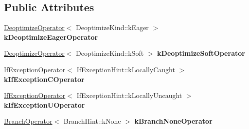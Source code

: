 \subsection*{Public Attributes}
\begin{DoxyCompactItemize}
\item 
\hyperlink{structv8_1_1internal_1_1compiler_1_1_common_operator_global_cache_1_1_deoptimize_operator}{Deoptimize\+Operator}$<$ Deoptimize\+Kind\+::k\+Eager $>$ {\bfseries k\+Deoptimize\+Eager\+Operator}\hypertarget{structv8_1_1internal_1_1compiler_1_1_common_operator_global_cache_ae3692729b84e54227b2440466cd98fbb}{}\label{structv8_1_1internal_1_1compiler_1_1_common_operator_global_cache_ae3692729b84e54227b2440466cd98fbb}

\item 
\hyperlink{structv8_1_1internal_1_1compiler_1_1_common_operator_global_cache_1_1_deoptimize_operator}{Deoptimize\+Operator}$<$ Deoptimize\+Kind\+::k\+Soft $>$ {\bfseries k\+Deoptimize\+Soft\+Operator}\hypertarget{structv8_1_1internal_1_1compiler_1_1_common_operator_global_cache_a9f1a5a98e0ddab0ee5ad4b43d15d36e4}{}\label{structv8_1_1internal_1_1compiler_1_1_common_operator_global_cache_a9f1a5a98e0ddab0ee5ad4b43d15d36e4}

\item 
\hyperlink{structv8_1_1internal_1_1compiler_1_1_common_operator_global_cache_1_1_if_exception_operator}{If\+Exception\+Operator}$<$ If\+Exception\+Hint\+::k\+Locally\+Caught $>$ {\bfseries k\+If\+Exception\+C\+Operator}\hypertarget{structv8_1_1internal_1_1compiler_1_1_common_operator_global_cache_a13053e13bccc3d76a2431196ec58a162}{}\label{structv8_1_1internal_1_1compiler_1_1_common_operator_global_cache_a13053e13bccc3d76a2431196ec58a162}

\item 
\hyperlink{structv8_1_1internal_1_1compiler_1_1_common_operator_global_cache_1_1_if_exception_operator}{If\+Exception\+Operator}$<$ If\+Exception\+Hint\+::k\+Locally\+Uncaught $>$ {\bfseries k\+If\+Exception\+U\+Operator}\hypertarget{structv8_1_1internal_1_1compiler_1_1_common_operator_global_cache_aa8570fd81219fa78f63c21b7d03fa15d}{}\label{structv8_1_1internal_1_1compiler_1_1_common_operator_global_cache_aa8570fd81219fa78f63c21b7d03fa15d}

\item 
\hyperlink{structv8_1_1internal_1_1compiler_1_1_common_operator_global_cache_1_1_branch_operator}{Branch\+Operator}$<$ Branch\+Hint\+::k\+None $>$ {\bfseries k\+Branch\+None\+Operator}\hypertarget{structv8_1_1internal_1_1compiler_1_1_common_operator_global_cache_a0fde8cda95bc4fc25b9d156c4f57d40f}{}\label{structv8_1_1internal_1_1compiler_1_1_common_operator_global_cache_a0fde8cda95bc4fc25b9d156c4f57d40f}


\end{DoxyCompactItemize}
